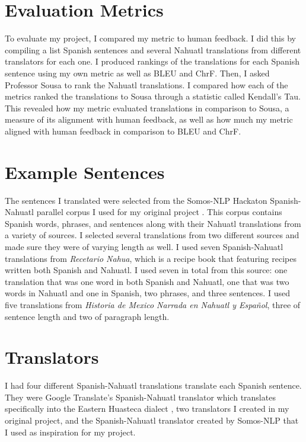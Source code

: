 \documentclass[10pt,twocolumn]{article}
\begin{document}
\section{Evaluation Metrics}

To evaluate my project, I compared my metric to human feedback. I did this by compiling a list Spanish sentences and several Nahuatl translations from different translators for each one. I produced rankings of the  translations for each Spanish sentence using my own metric as well as BLEU and ChrF. Then, I asked Professor Sousa to rank the Nahuatl translations. I compared how each of the metrics ranked the translations to Sousa through a statistic called Kendall's Tau. This revealed how my metric evaluated translations in comparison to Sousa, a measure of its alignment with human feedback, as well as how much my metric aligned with human feedback in comparison to BLEU and ChrF.

\section{Example Sentences}
The sentences I translated were selected from the Somos-NLP Hackaton Spanish-Nahuatl parallel corpus I used for my original project \cite{SomosNLP}. This corpus contains Spanish words, phrases, and sentences along with their Nahuatl translations from a variety of sources. I selected several translations from two different sources and made sure they were of varying length as well. I used seven Spanish-Nahuatl translations from \textit{Recetario Nahua}, which is a recipe book that featuring recipes written both Spanish and Nahuatl. I used seven in total from this source: one translation that was one word in both Spanish and Nahuatl, one that was two words in Nahuatl and one in Spanish, two phrases, and three sentences. I used five translations from \textit{Historia de Mexico Narrada en Nahuatl y Español}, three of sentence length and two of paragraph length. 

\section{Translators}
I had four different Spanish-Nahuatl translations translate  each Spanish sentence. They were Google Translate's Spanish-Nahuatl translator which translates specifically into the Eastern Huasteca dialect \cite{GoogleTranslate}, two translators I created in my original project, and the Spanish-Nahuatl translator created by Somos-NLP \cite{SomosNLP} that I used as inspiration for my project.
\end{document}
